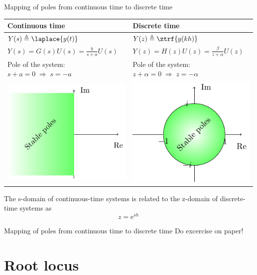 \documentclass[presentation,aspectratio=169]{beamer}
\begin{document}
\begin{frame}[label=sec-2-2]{Mapping of poles from continuous time to discrete time}
\begin{center}
\begin{tabular}{ll}
Continuous time & Discrete time\\
\hline
\(Y(s) \triangleq \laplace{y(t)}\) & \(Y(z) \triangleq \ztrf{y(kh)}\)\\
\( Y(s) = G(s)U(s) = \frac{b}{s+a}U(s)\) & \(Y(z) = H(z)U(z) = \frac{\beta}{z+\alpha}U(z)\)\\
Pole of the system: \(s+a=0 \; \Rightarrow \; s = -a\) & Pole of the system: \( z+\alpha = 0 \; \Rightarrow \; z = -\alpha \)\\
\includegraphics[width=0.22\linewidth]{../../figures/cont-stable} & \includegraphics[width=0.22\linewidth]{../../figures/discrete-stable}\\
\hline
\end{tabular}
\end{center}

The \alert{s-domain} of continuous-time systems is related to the \alert{z-domain} of discrete-time systems as  \[z = \mathrm{e}^{sh}\]
\end{frame}

\begin{frame}[label=sec-2-3]{Mapping of poles from continuous time to discrete time}
Do excercise on paper!
\end{frame}

\section{Root locus}
\label{sec-3}
\end{document}
